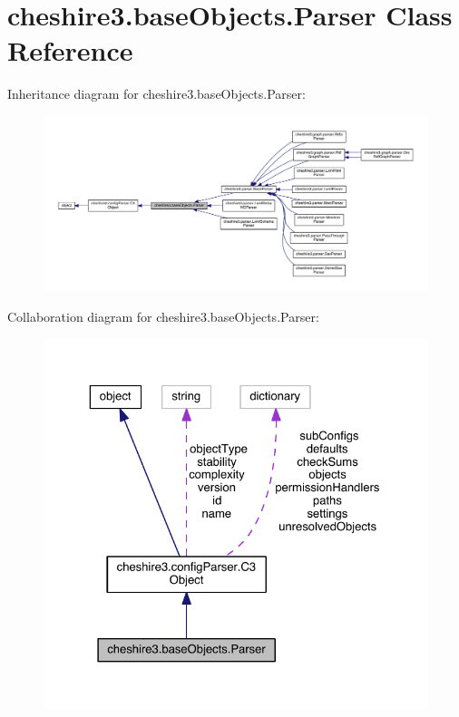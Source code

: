 \hypertarget{classcheshire3_1_1base_objects_1_1_parser}{\section{cheshire3.\-base\-Objects.\-Parser Class Reference}
\label{classcheshire3_1_1base_objects_1_1_parser}
}


Inheritance diagram for cheshire3.\-base\-Objects.\-Parser\-:
\nopagebreak
\begin{figure}[H]
\begin{center}
\leavevmode
\includegraphics[width=350pt]{classcheshire3_1_1base_objects_1_1_parser__inherit__graph}
\end{center}
\end{figure}


Collaboration diagram for cheshire3.\-base\-Objects.\-Parser\-:
\nopagebreak
\begin{figure}[H]
\begin{center}
\leavevmode
\includegraphics[width=325pt]{classcheshire3_1_1base_objects_1_1_parser__coll__graph}
\end{center}
\end{figure}
